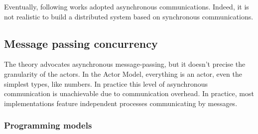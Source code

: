 Eventually, following works adopted asynchronous communications.
Indeed, it is not realistic to build a distributed system based on synchronous communications.














\subsection{Message passing concurrency} \label{chapter3:parallel-execution:message-passing}


The theory advocates asynchronous message-passing, but it doesn't precise the granularity of the actors.
In the Actor Model, everything is an actor, even the simplest types, like numbers.
In practice this level of asynchronous communication is unachievable due to communication overhead.
In practice, most implementations feature independent processes communicating by messages.

\subsubsection{Programming models}

